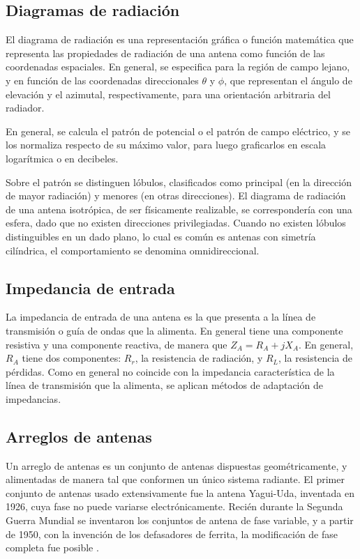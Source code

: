 \subsection{Diagramas de radiación}
\label{subsubsec_diag_de_rad}
El diagrama de radiación es una representación gráfica o función matemática que representa las propiedades de radiación de una antena como función de las coordenadas espaciales. En general, se especifica para la región de campo lejano, y en función de las coordenadas direccionales $\theta$ y $\phi$, que representan el ángulo de elevación y el azimutal, respectivamente, para una orientación arbitraria del radiador.

En general, se calcula el patrón de potencial o el patrón de campo eléctrico, y se los normaliza respecto de su máximo valor, para luego graficarlos en escala logarítmica o en decibeles.

Sobre el patrón se distinguen lóbulos, clasificados como principal (en la dirección de mayor radiación) y menores (en otras direcciones). El diagrama de radiación de una antena isotrópica, de ser físicamente realizable, se correspondería con una esfera, dado que no existen direcciones privilegiadas. Cuando no existen lóbulos distinguibles en un dado plano, lo cual es común es antenas con simetría cilíndrica, el comportamiento se denomina omnidireccional.

\subsection{Impedancia de entrada}
\label{subsec_imp_entrada}
La impedancia de entrada de una antena es la que presenta a la línea de transmisión o guía de ondas que la alimenta. En general tiene una componente resistiva y una componente reactiva, de manera que $Z_A = R_A + j X_A$. En general, $R_A$ tiene dos componentes: $R_r$, la resistencia de radiación, y $R_L$, la resistencia de pérdidas. Como en general no coincide con la impedancia característica de la línea de transmisión que la alimenta, se aplican métodos de adaptación de impedancias.

\subsection{Arreglos de antenas}

Un arreglo de antenas es un conjunto de antenas dispuestas geométricamente, y alimentadas de manera tal que conformen un único sistema radiante. El primer conjunto de antenas usado extensivamente fue la antena Yagui-Uda, inventada en 1926, cuya fase no puede variarse electrónicamente. Recién durante la Segunda Guerra Mundial se inventaron los conjuntos de antena de fase variable, y a partir de 1950, con la invención de los defasadores de ferrita, la modificación de fase completa fue posible \cite{Stutzman:AntennaTheory}.

